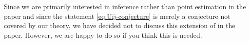 \documentclass[a4paper,12pt]{article}
\begin{document}
\begin{enumerate}[label=(\arabic*),leftmargin=0.7cm]
Since we are primarily interested in inference rather than point estimation in the paper and since the statement \eqref{eq:Uij-conjecture} is merely a conjecture not covered by our theory, we have decided not to discuss this extension of in the paper. However, we are happy to do so if you think this is needed. 
 












\end{enumerate}
\end{document}
